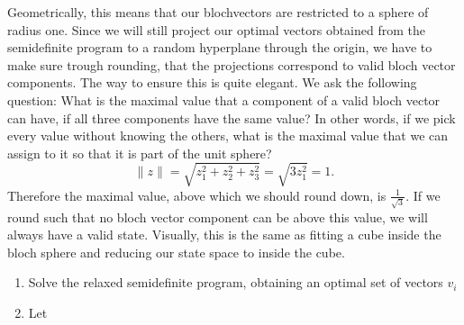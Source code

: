 Geometrically, this means that our blochvectors are restricted to a sphere of radius one.
Since we will still project our optimal vectors obtained from the semidefinite program to a random hyperplane through the origin, we have to make sure trough rounding, that the projections correspond to valid bloch vector components.
The way to ensure this is quite elegant.
We ask the following question: What is the maximal value that a component of a valid bloch vector can have, if all three components have the same value?
In other words, if we pick every value without knowing the others, what is the maximal value that we can assign to it so that it is part of the unit sphere?\[
\|z\|=\sqrt{z_1^2+z_2^2+z_3^2}=\sqrt{3z_1^2}=1
.\]
Therefore the maximal value, above which we should round down, is $\frac{1}{\sqrt{3}}$.
If we round such that no bloch vector component can be above this value, we will always have a valid state.
Visually, this is the same as fitting a cube inside the bloch sphere and reducing our state space to inside the cube.
\begin{enumerate}
	\item Solve the relaxed semidefinite program, obtaining an optimal set of vectors $v_i$
	\item Let
\end{enumerate}

